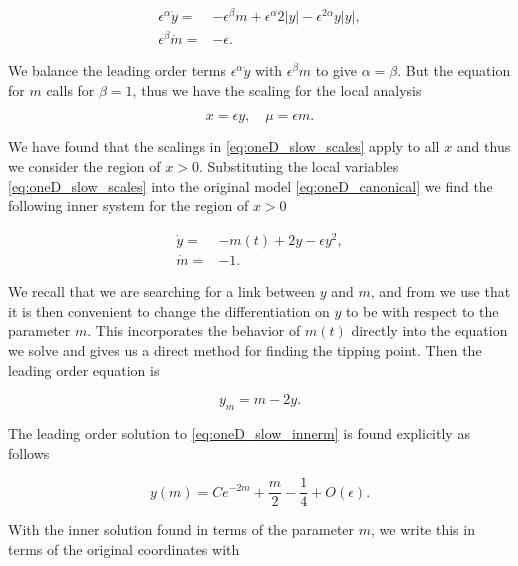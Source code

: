 \begin{equation}\label{eq:oneD_slow_scalesearch}
\begin{aligned}
\epsilon^\alpha \dot{y}=&-\epsilon^\beta m +\epsilon^\alpha 2|y|-\epsilon^{2\alpha}y|y|,\\
 \epsilon^\beta \dot{m}=&-\epsilon.
\end{aligned}
\end{equation}

We balance the leading order terms $\epsilon^\alpha\dot{y}$ with $\epsilon^\beta m$ to give $\alpha=\beta$. But the equation for $m$ calls for $\beta=1$, thus we have the scaling for the local analysis

\begin{equation}\label{eq:oneD_slow_scales}
x=\epsilon y,\quad \mu=\epsilon m.
\end{equation}

We have found that the scalings in \eqref{eq:oneD_slow_scales} apply to all $x$ and thus we consider the region of $x>0$. Substituting the local variables \eqref{eq:oneD_slow_scales} into the original model \eqref{eq:oneD_canonical} we find the following inner system for the region of $x>0$

\begin{equation}\label{eq:oneD_slow_innereq}
\begin{aligned}
\dot{y}=&-m(t)+2 y-\epsilon y^2,\\
\dot{m}=&-1.
\end{aligned}
\end{equation}

We recall that we are searching for a link between $y$ and $m$, and from \cite{haberman1979slowly} we use that it is then convenient to change the differentiation on $y$ to be with respect to the parameter $m$. This incorporates the behavior of $m(t)$ directly into the equation we solve and gives us a direct method for finding the tipping point. Then the leading order equation is

\begin{equation}\label{eq:oneD_slow_innerm}
y_m = m-2y.
\end{equation}

The leading order solution to \eqref{eq:oneD_slow_innerm} is found explicitly as follows

\begin{equation*}
y(m) = C e^{-2m}+\frac{m}{2}-\frac{1}{4}+O(\epsilon).
\end{equation*}

With the inner solution found in terms of the parameter $m$, we write this in terms of the original coordinates with

